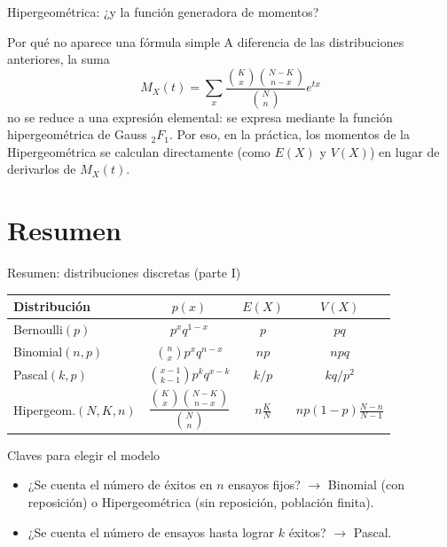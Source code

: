 \documentclass[aspectratio=169,11pt]{beamer}
\begin{document}
\begin{frame}{Hipergeométrica: ¿y la función generadora de momentos?}
\begin{alertblock}{Por qué no aparece una fórmula simple}
A diferencia de las distribuciones anteriores, la suma
$$M_X(t)=\sum_x \frac{\binom{K}{x}\binom{N-K}{n-x}}{\binom{N}{n}}e^{tx}$$
no se reduce a una expresión elemental: se expresa mediante la función hipergeométrica de Gauss ${}_2F_1$. Por eso, en la práctica, los momentos de la Hipergeométrica se calculan directamente (como $E(X)$ y $V(X)$) en lugar de derivarlos de $M_X(t)$.
\end{alertblock}
\end{frame}

\section{Resumen}

\begin{frame}{Resumen: distribuciones discretas (parte I)}
\begin{center}
\small
\begin{tabular}{lccc}
\toprule
\textbf{Distribución} & \textbf{$p(x)$} & \textbf{$E(X)$} & \textbf{$V(X)$} \\
\midrule
Bernoulli$(p)$ & $p^xq^{1-x}$ & $p$ & $pq$ \\
Binomial$(n,p)$ & $\binom{n}{x}p^xq^{n-x}$ & $np$ & $npq$ \\
Pascal$(k,p)$ & $\binom{x-1}{k-1}p^kq^{x-k}$ & $k/p$ & $kq/p^2$ \\
Hipergeom.$(N,K,n)$ & $\dfrac{\binom{K}{x}\binom{N-K}{n-x}}{\binom{N}{n}}$ & $n\frac{K}{N}$ & $np(1-p)\frac{N-n}{N-1}$ \\
\bottomrule
\end{tabular}
\end{center}

\begin{alertblock}{Claves para elegir el modelo}
\begin{itemize}
\item ¿Se cuenta el número de éxitos en $n$ ensayos fijos? $\to$ Binomial (con reposición) o Hipergeométrica (sin reposición, población finita).
\item ¿Se cuenta el número de ensayos hasta lograr $k$ éxitos? $\to$ Pascal.
\end{itemize}
\end{alertblock}
\end{frame}
\end{document}
